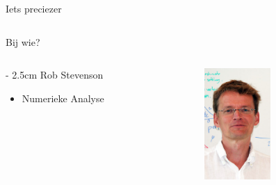 \documentclass{beamer}
\begin{document}
\begin{frame}{Iets preciezer}
\begin{columns}[t]
\begin{column}[T]{2.5cm}
\end{column}
\end{columns}
\end{frame}

\begin{frame}{Bij wie?}
  \begin{columns}[t]
    \begin{column}[T]{\linewidth - 2.5cm}
      Rob Stevenson
      \begin{itemize}
        \item Numerieke Analyse
      \end{itemize}
    \end{column}
    \begin{column}[T]{2.5cm}
      \includegraphics[width=2.5cm]{Stevenson_RP.jpg}
    \end{column}
  \end{columns}
\end{frame}
\end{document}
